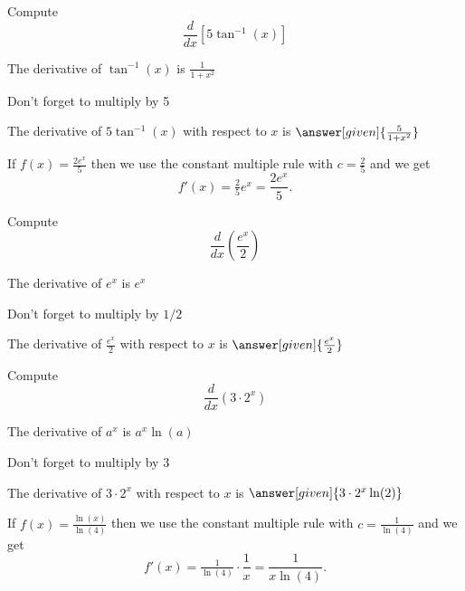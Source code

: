 \documentclass{ximera}
\begin{document}
\begin{problem} %
  Compute 
  \[
  \frac{d}{dx} \left[5\tan^{-1}(x)\right]
  \]
  
    \begin{hint}
      The derivative of $\tan^{-1}(x)$ is $\frac{1}{1+x^2}$
    \end{hint}
		\begin{hint}
		  Don't forget to multiply by 5
		\end{hint}
		
		The derivative of $5\tan^{-1}(x)$ with respect to $x$ is
		 $\answer[given]{\frac{5}{1+x^2}}$
	
\end{problem}


\begin{example} %
 If $f(x) = \frac{2e^x}{5}$ then we use the constant multiple rule with $c = \frac25$ and we get 
\[
f'(x) = \tfrac25 e^x = \frac{2e^x}{5}.
\]
\end{example}


\begin{problem} %
  Compute 
  \[
  \frac{d}{dx} \left(\frac{e^x}{2}\right)
  \]
  
    \begin{hint}
      The derivative of $e^x$ is $e^x$
    \end{hint}
		\begin{hint}
		  Don't forget to multiply by $1/2$
		\end{hint}
		
		The derivative of $\frac{e^x}{2}$ with respect to $x$ is
		 $\answer[given]{\frac{e^x}{2}}$
	
\end{problem}


\begin{problem} %
  Compute 
  \[
  \frac{d}{dx} \left(3\cdot 2^x\right)
  \]
  
    \begin{hint}
      The derivative of $a^x$ is $a^x \ln(a)$
    \end{hint}
		\begin{hint}
		  Don't forget to multiply by $3$
		\end{hint}
		
		The derivative of $3\cdot 2^x$ with respect to $x$ is
		 $\answer[given]{3\cdot 2^x \ln(2)}$
	
\end{problem}


\begin{example} %
 If $f(x) = \frac{\ln(x)}{\ln(4)}$ then we use the constant multiple rule with $c = \frac{1}{\ln(4)}$ 
and we get 
\[
f'(x) = \tfrac{1}{\ln(4)} \cdot \frac{1}{x} = \frac{1}{x\ln(4)}.
\]
\end{example}
\end{document}
